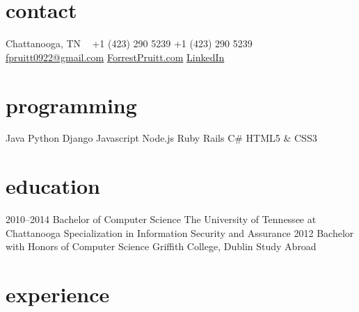 \documentclass[]{friggeri-cv} %
\begin{document}


\begin{aside} %
\section{contact}
Chattanooga, TN
~
+1 (423) 290 5239
+1 (423) 290 5239
~
\href{mailto:fpruitt0922@gmail.com}{fpruitt0922@gmail.com}
\href{http://www.forrestpruitt.com}{ForrestPruitt.com}
\href{https://www.linkedin.com/pub/forrest-pruitt/48/993/b13}{LinkedIn}
\section{programming}
Java
Python
Django
Javascript
Node.js
Ruby
Rails
C\#
HTML5 \& CSS3
\end{aside}


\section{education}

\begin{entrylist}
\entry
{2010--2014}
{Bachelor {\normalfont of Computer Science}}
{The University of Tennessee at Chattanooga}
{Specialization in Information Security and Assurance}
\entry
{2012}
{Bachelor with Honors {\normalfont of Computer Science}}
{Griffith College, Dublin}
{Study Abroad}
\end{entrylist}


\section{experience}
\end{document}
